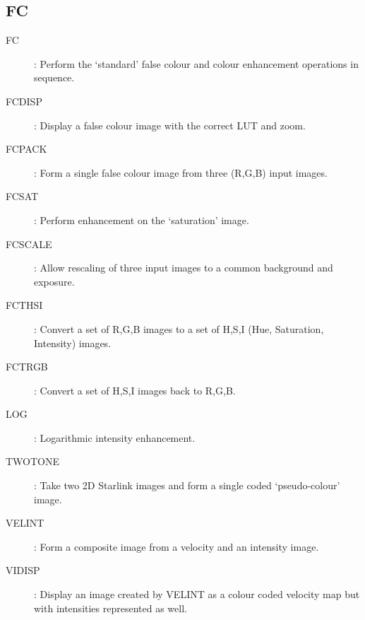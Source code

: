 \subsection {FC}
\begin{description}
\item [FC]: Perform the `standard' false colour and colour enhancement
operations in sequence.
\item [FCDISP]: Display a false colour image with the correct LUT and zoom.
\item [FCPACK]: Form a single false colour image from three (R,G,B) input
images.
\item [FCSAT]: Perform enhancement on the `saturation' image.
\item [FCSCALE]: Allow rescaling of three input images to a common background
and exposure.
\item [FCTHSI]: Convert a set of R,G,B images to a set of H,S,I (Hue,
Saturation, Intensity) images.
\item [FCTRGB]: Convert a set of H,S,I images back to R,G,B.
\item [LOG]: Logarithmic intensity enhancement.
\item [TWOTONE]: Take two 2D Starlink images and form a single coded
`pseudo-colour' image.
\item [VELINT]: Form a composite image from a velocity and an intensity image.
\item [VIDISP]: Display an image created by VELINT as a colour coded velocity
map but with intensities represented as well.
\end{description}
